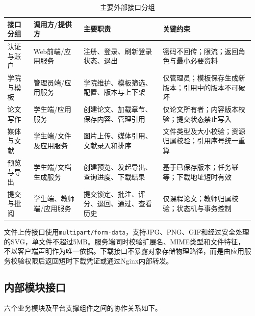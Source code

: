 \documentclass{../template/softeng}
\begin{document}
	\begin{table}[htbp]
		\centering
		\small
		\caption{主要外部接口分组}
		\begin{tabular}{p{2.3cm}p{3.0cm}p{3.0cm}p{4.2cm}}
			\toprule
			接口分组 & 调用方/提供方 & 主要职责 & 关键约束 \\
			\midrule
			认证与账户 & Web前端/应用服务 & 注册、登录、刷新登录状态、退出 & 密码不回传；限流；返回角色与最小必要资料 \\
			学院与模板 & 管理员端/应用服务 & 学院维护、模板筛选、配置、版本与上下架 & 仅管理员；模板保存生成新版本；引用中的版本不可破坏 \\
			论文写作 & 学生端/应用服务 & 创建论文、加载章节、保存内容、管理引用 & 仅论文所有者；内容版本校验；提交状态禁止写入 \\
			媒体与文献 & 学生端/文件及应用服务 & 图片上传、媒体引用、文献录入和排序 & 文件类型及大小校验；资源归属校验；引用序号统一重算 \\
			预览与导出 & 学生端/文档生成服务 & 创建预览、发起导出、查询进度、下载结果 & 基于已保存版本；任务幂等；下载地址短时有效 \\
			提交与批阅 & 学生端、教师端/应用服务 & 提交锁定、批注、评分、退回、通过、查看历史 & 仅课程论文；教师归属校验；状态机与事务控制 \\
			\bottomrule
		\end{tabular}
	\end{table}
	
	文件上传接口使用\texttt{multipart/form-data}，支持JPG、PNG、GIF和经过安全处理的SVG，单文件不超过5MB。服务端同时校验扩展名、MIME类型和文件特征，不以客户端声明作为唯一依据。下载接口不暴露对象存储物理路径，而是由应用服务校验权限后返回短时下载凭证或通过Nginx内部转发。
	
	\subsection{内部模块接口}
	六个业务模块及平台支撑组件之间的协作关系如下。
	
\end{document}
